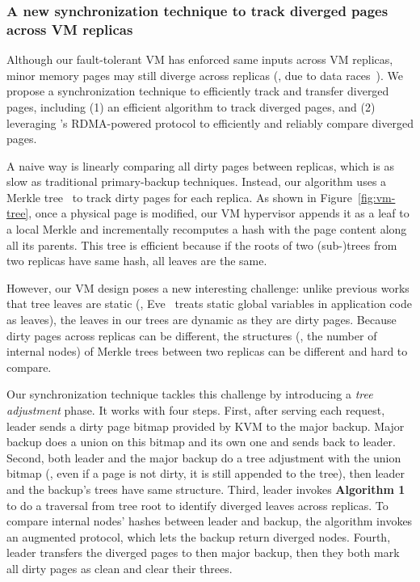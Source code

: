 \vspace{-.15in}\subsubsection{A new synchronization technique to 
track diverged pages across VM replicas}
\label{sec:tracking}\vspace{-.075in}



Although our fault-tolerant VM has enforced same inputs across VM replicas, 
minor memory pages may still diverge across replicas (\eg, due to 
data races~\cite{lu:concurrency-bugs}). We propose a synchronization 
technique to efficiently track and transfer diverged pages, including (1) 
an efficient  algorithm to track diverged pages, and (2) 
leveraging \falcon's RDMA-powered protocol to efficiently and reliably compare 
diverged pages.

A naive way is linearly comparing all  dirty pages between replicas, 
which is as slow as traditional primary-backup techniques. Instead, our 
algorithm uses a Merkle tree~\cite{eve:osdi12} to track dirty pages for each 
replica. As shown in Figure~\ref{fig:vm-tree}, once a physical page is modified, 
our VM hypervisor appends it as a leaf to a local Merkle and incrementally 
recomputes a hash with the page content along all its parents. This tree 
is efficient because if the roots of two (sub-)trees from two replicas have 
same hash, all leaves are the same.

However, our VM design poses a new interesting challenge: unlike previous works 
that tree leaves are static (\eg, Eve~\cite{eve:osdi12} treats static global 
variables in application code as leaves), the leaves in our trees are dynamic 
as they are dirty pages. Because dirty pages across replicas can be 
different, the structures (\ie, the number of internal nodes) of Merkle trees 
between two replicas can be different and hard to compare.

Our synchronization technique tackles this challenge by introducing a 
\emph{tree adjustment} phase. It works with four steps. First, after 
serving each request, leader sends a dirty page bitmap provided by KVM to 
the major backup. Major backup does a union on this bitmap and its own one 
and sends back to leader. Second, both leader and the major backup do 
a tree adjustment with the union bitmap (\eg, even if a page is not dirty, it is 
still appended to the tree), then leader and the backup's trees have same 
structure. Third, leader invokes \textbf{Algorithm 1} to do a  
traversal from tree root to identify diverged leaves across replicas. To 
compare internal nodes' hashes between leader and backup, the algorithm invokes 
an augmented \falcon protocol, which lets the backup return diverged nodes. 
Fourth, leader transfers the diverged pages to then major backup, then they 
both mark all dirty pages as clean and clear their threes.

